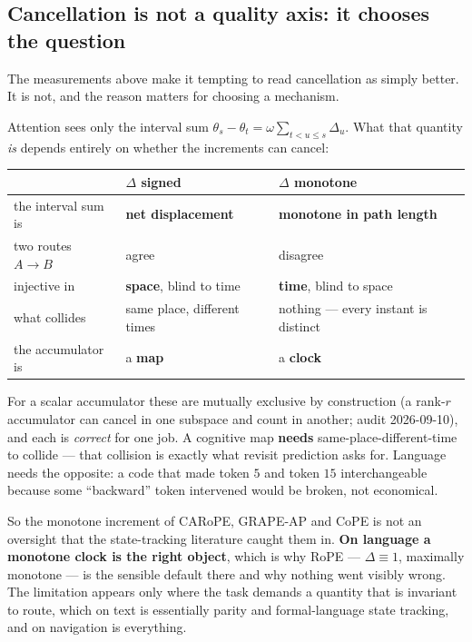 \documentclass[11pt]{article}
\begin{document}
\subsection{Cancellation is not a quality axis: it chooses the question}
\label{sec:clockmap}

The measurements above make it tempting to read cancellation as simply better. It
is not, and the reason matters for choosing a mechanism.

Attention sees only the interval sum
$\theta_s - \theta_t = \omega\sum_{t<u\le s}\Delta_u$. What that quantity
\emph{is} depends entirely on whether the increments can cancel:

\begin{center}\small
\begin{tabular}{@{}p{3.0cm}p{5.3cm}p{5.6cm}@{}}
\toprule
 & $\Delta$ signed & $\Delta$ monotone \\
\midrule
the interval sum is & \textbf{net displacement} & \textbf{monotone in path length} \\[2pt]
two routes $A\!\to\!B$ & agree & disagree \\[2pt]
injective in & \textbf{space}, blind to time & \textbf{time}, blind to space \\[2pt]
what collides & same place, different times & nothing --- every instant is distinct \\[2pt]
the accumulator is & a \textbf{map} & a \textbf{clock} \\
\bottomrule
\end{tabular}
\end{center}

\noindent For a scalar accumulator these are mutually exclusive by construction (a
rank-$r$ accumulator can cancel in one subspace and count in another; audit
2026-09-10), and each is \emph{correct} for one job. A cognitive map \textbf{needs} same-place-different-time to collide ---
that collision is exactly what revisit prediction asks for. Language needs the
opposite: a code that made token $5$ and token $15$ interchangeable because some
``backward'' token intervened would be broken, not economical.

So the monotone increment of CARoPE, GRAPE-AP and CoPE is not an oversight that the
state-tracking literature caught them in. \textbf{On language a monotone clock is the
right object}, which is why RoPE --- $\Delta\equiv1$, maximally monotone --- is the
sensible default there and why nothing went visibly wrong. The limitation appears
only where the task demands a quantity that is invariant to route, which on text is
essentially parity and formal-language state tracking, and on navigation is
everything.
\end{document}

